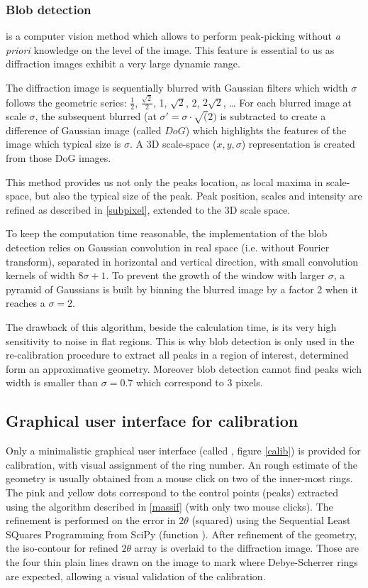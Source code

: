\documentclass[preprint]{iucr}
\begin{document}
\subsubsection{Blob detection}
\label{blob}
is a computer vision method which allows to perform peak-picking without
\textit{a priori} knowledge on the level of the image.
This feature is essential to us as diffraction images exhibit a very large
dynamic range.

The diffraction image is sequentially blurred with Gaussian filters which
width $\sigma$ follows the geometric series: $\frac{1}{2}$,
$\frac{\sqrt{2}}{2}$, 1, $\sqrt{2}$, 2, $2\sqrt{2}$, \ldots
For each blurred image at scale $\sigma$, the subsequent blurred (at
$\sigma'=\sigma\cdot\sqrt(2)$
is subtracted to create a difference of Gaussian
image (called $DoG$) which highlights the features of the image which typical
size is $\sigma$. 
A 3D scale-space ($x,y,\sigma$) representation is created from those DoG images.

This method provides us not only the peaks location, as local maxima in
scale-space, but also the typical size of the peak. 
Peak position, scales and intensity are refined as described in
\ref{subpixel}, extended to the 3D scale space.

To keep the computation time reasonable, the implementation of the blob
detection relies on Gaussian convolution in real space (i.e. without Fourier
transform), separated in horizontal and vertical direction, with small
convolution kernels of width $8 \sigma +1$.
To prevent the growth of the window with larger $\sigma$, a pyramid of Gaussians
is built by binning the blurred image by a factor 2 when it reaches a
$\sigma=2$.

The drawback of this algorithm, beside the calculation time, is its very high
sensitivity to noise in flat regions. 
This is why blob detection is only used in the re-calibration procedure to
extract all peaks in a region of interest, determined form an
approximative geometry.
Moreover blob detection cannot find peaks wich width is smaller than  
$\sigma=0.7$ which correspond to 3 pixels.


\subsection{Graphical user interface for calibration}
Only a minimalistic graphical user interface (called
, figure \ref{calib}) is provided
for calibration, with visual assignment of the ring number.
An rough estimate of the geometry is usually obtained from a mouse click on 
two of the inner-most rings. 
The pink and yellow dots correspond to the control points (peaks) extracted
using the algorithm described in \ref{massif} (with only two mouse clicks).
The refinement is performed on the error in $2\theta$ (squared) using the 
Sequential Least SQuares Programming  from
SciPy (function ).
After refinement of the geometry, the iso-contour for refined $2\theta$ array is
overlaid to the diffraction image. Those are the four thin plain lines drawn on
the image to mark where Debye-Scherrer rings are expected, allowing a visual 
validation of the calibration.
\end{document}

